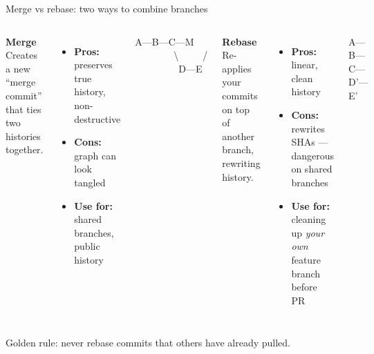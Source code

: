 \documentclass[10pt,aspectratio=169]{beamer}
\begin{document}
\begin{frame}{Merge vs rebase: two ways to combine branches}
  \begin{columns}[T]
    \textbf{\color{ghAccent}Merge}\\[0.3em]
    Creates a new ``merge commit'' that ties two histories together.
    \begin{itemize}
      \item \textbf{Pros:} preserves true history, non-destructive
      \item \textbf{Cons:} graph can look tangled
      \item \textbf{Use for:} shared branches, public history
    \end{itemize}
    \begin{center}
      \scriptsize\ttfamily
      A---B---C---M\\
      ~~~~~~~~\textbackslash~~~~~/\\
      ~~~~~~~~~D---E
    \end{center}

    \textbf{\color{ghAccent}Rebase}\\[0.3em]
    Re-applies your commits on top of another branch, rewriting history.
    \begin{itemize}
      \item \textbf{Pros:} linear, clean history
      \item \textbf{Cons:} rewrites SHAs --- dangerous on shared branches
      \item \textbf{Use for:} cleaning up \emph{your own} feature branch before PR
    \end{itemize}
    \begin{center}
      \scriptsize\ttfamily
      A---B---C---D'---E'
    \end{center}
  \end{columns}

  \vspace{0.6em}
  \begin{center}
    \alert{Golden rule:} never rebase commits that others have already pulled.
  \end{center}
\end{frame}
\end{document}
